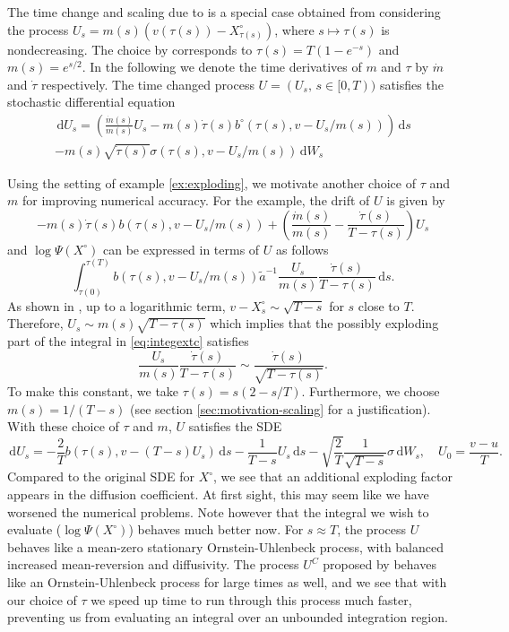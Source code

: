 \documentclass[preprint]{imsart}
\newcommand{\si}{\sigma}
\renewcommand{\tilde}{\widetilde}
\theoremstyle{definition}
\newcommand{\dd}{{\,\mathrm d}}
\begin{document}
The time change and scaling due to \cite{Clark} is a special case obtained from considering the process $U_s=m(s)\left(v(\tau(s))-X^\circ_{\tau(s)}\right)$, where $s\mapsto \tau(s)$ is nondecreasing. The choice by \cite{Clark} corresponds to  $\tau(s)=T(1-e^{-s})$ and $m(s)=e^{s/2}$. In the following we denote the time derivatives of $m$ and $\tau$ by $\dot m$ and $\dot \tau$ respectively. 
The time changed process $U=(U_s,\, s\in [0,T))$ satisfies the stochastic differential equation
\begin{multline*}
\dd U_s =  \left(\frac{\dot{m}(s)}{m(s)} U_s  -m(s) \dot\tau(s) b^\circ(\tau(s),v-U_s/m(s))\right) \dd s \\   -m(s) \sqrt{\dot \tau(s)} \si(\tau(s), v-U_s/m(s)) \dd W_s
\end{multline*}



Using the setting of example \ref{ex:exploding}, we motivate another choice of $\tau$ and $m$ for improving numerical accuracy. For the example,  the drift of $U$ is given by 
\[ -m(s)\dot\tau(s) b(\tau(s), v-U_s/m(s)) + \left(\frac{\dot m(s)}{m(s)} - \frac{\dot \tau(s)}{T-\tau(s)} \right) U_s \]
and  $\log \Psi(X^\circ)$ can be expressed in terms of $U$ as follows
\begin{equation}\label{eq:integextc}  \int_{\tau(0)}^{\tau(T)} b(\tau(s),v-U_s/m(s)) \tilde{a}^{-1} \frac{U_s}{m(s)} \frac{\dot \tau(s)}{T-\tau(s)} \dd s . \end{equation}
 As shown in \cite{Schauer}, up to a logarithmic term, $v-X^\circ_s \sim \sqrt{T-s}$ for $s$ close to $T$. Therefore,
$U_s \sim m(s) \sqrt{T-\tau(s)}$ which implies that the possibly exploding part of the integral in \eqref{eq:integextc} satisfies
\[    \frac{U_s}{m(s)} \frac{\dot \tau(s)}{T-\tau(s)} \sim \frac{\dot\tau(s)}{\sqrt{T-\tau(s)}}. \]
To make this constant, we take $\tau(s)=s(2-s/T)$. 
Furthermore, we choose $m(s)=1/(T-s)$ (see section \ref{sec:motivation-scaling} for a justification). 
With these choice of $\tau$ and $m$, $U$ satisfies the SDE
\[ \dd U_s =-\frac2{T} b(\tau(s),v-(T-s) U_s) \dd s - \frac1{T-s} U_s\dd s - \sqrt{\frac{2}{T}} \frac1{\sqrt{T-s}} \si \dd W_s,\quad U_0=\frac{v-u}{T}. \]
Compared to the original SDE for $X^\circ$, we see that an additional exploding factor appears in the diffusion coefficient. At first sight, this may seem like we have worsened the numerical problems. Note however that the integral we wish to evaluate ($\log \Psi(X^\circ)$) behaves much better now. For $s\approx T$, the process $U$ behaves like a mean-zero stationary Ornstein-Uhlenbeck process, with balanced increased mean-reversion and diffusivity. The process $U^C$ proposed by \cite{Clark} behaves like an Ornstein-Uhlenbeck process for large times as well, and we see that with our choice of $\tau$ we speed up time to run through this process much faster, preventing us from evaluating an integral over an unbounded integration region. 
\end{document}
